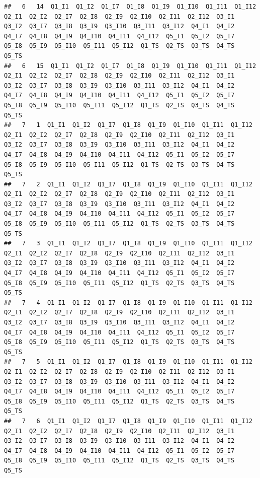 \documentclass[
]{book}
\begin{document}
\begin{verbatim}
##   6   14  Q1_I1  Q1_I2  Q1_I7  Q1_I8  Q1_I9  Q1_I10  Q1_I11  Q1_I12  Q2_I1  Q2_I2  Q2_I7  Q2_I8  Q2_I9  Q2_I10  Q2_I11  Q2_I12  Q3_I1  Q3_I2  Q3_I7  Q3_I8  Q3_I9  Q3_I10  Q3_I11  Q3_I12  Q4_I1  Q4_I2  Q4_I7  Q4_I8  Q4_I9  Q4_I10  Q4_I11  Q4_I12  Q5_I1  Q5_I2  Q5_I7  Q5_I8  Q5_I9  Q5_I10  Q5_I11  Q5_I12  Q1_TS  Q2_TS  Q3_TS  Q4_TS  Q5_TS
##   6   15  Q1_I1  Q1_I2  Q1_I7  Q1_I8  Q1_I9  Q1_I10  Q1_I11  Q1_I12  Q2_I1  Q2_I2  Q2_I7  Q2_I8  Q2_I9  Q2_I10  Q2_I11  Q2_I12  Q3_I1  Q3_I2  Q3_I7  Q3_I8  Q3_I9  Q3_I10  Q3_I11  Q3_I12  Q4_I1  Q4_I2  Q4_I7  Q4_I8  Q4_I9  Q4_I10  Q4_I11  Q4_I12  Q5_I1  Q5_I2  Q5_I7  Q5_I8  Q5_I9  Q5_I10  Q5_I11  Q5_I12  Q1_TS  Q2_TS  Q3_TS  Q4_TS  Q5_TS
##   7   1  Q1_I1  Q1_I2  Q1_I7  Q1_I8  Q1_I9  Q1_I10  Q1_I11  Q1_I12  Q2_I1  Q2_I2  Q2_I7  Q2_I8  Q2_I9  Q2_I10  Q2_I11  Q2_I12  Q3_I1  Q3_I2  Q3_I7  Q3_I8  Q3_I9  Q3_I10  Q3_I11  Q3_I12  Q4_I1  Q4_I2  Q4_I7  Q4_I8  Q4_I9  Q4_I10  Q4_I11  Q4_I12  Q5_I1  Q5_I2  Q5_I7  Q5_I8  Q5_I9  Q5_I10  Q5_I11  Q5_I12  Q1_TS  Q2_TS  Q3_TS  Q4_TS  Q5_TS
##   7   2  Q1_I1  Q1_I2  Q1_I7  Q1_I8  Q1_I9  Q1_I10  Q1_I11  Q1_I12  Q2_I1  Q2_I2  Q2_I7  Q2_I8  Q2_I9  Q2_I10  Q2_I11  Q2_I12  Q3_I1  Q3_I2  Q3_I7  Q3_I8  Q3_I9  Q3_I10  Q3_I11  Q3_I12  Q4_I1  Q4_I2  Q4_I7  Q4_I8  Q4_I9  Q4_I10  Q4_I11  Q4_I12  Q5_I1  Q5_I2  Q5_I7  Q5_I8  Q5_I9  Q5_I10  Q5_I11  Q5_I12  Q1_TS  Q2_TS  Q3_TS  Q4_TS  Q5_TS
##   7   3  Q1_I1  Q1_I2  Q1_I7  Q1_I8  Q1_I9  Q1_I10  Q1_I11  Q1_I12  Q2_I1  Q2_I2  Q2_I7  Q2_I8  Q2_I9  Q2_I10  Q2_I11  Q2_I12  Q3_I1  Q3_I2  Q3_I7  Q3_I8  Q3_I9  Q3_I10  Q3_I11  Q3_I12  Q4_I1  Q4_I2  Q4_I7  Q4_I8  Q4_I9  Q4_I10  Q4_I11  Q4_I12  Q5_I1  Q5_I2  Q5_I7  Q5_I8  Q5_I9  Q5_I10  Q5_I11  Q5_I12  Q1_TS  Q2_TS  Q3_TS  Q4_TS  Q5_TS
##   7   4  Q1_I1  Q1_I2  Q1_I7  Q1_I8  Q1_I9  Q1_I10  Q1_I11  Q1_I12  Q2_I1  Q2_I2  Q2_I7  Q2_I8  Q2_I9  Q2_I10  Q2_I11  Q2_I12  Q3_I1  Q3_I2  Q3_I7  Q3_I8  Q3_I9  Q3_I10  Q3_I11  Q3_I12  Q4_I1  Q4_I2  Q4_I7  Q4_I8  Q4_I9  Q4_I10  Q4_I11  Q4_I12  Q5_I1  Q5_I2  Q5_I7  Q5_I8  Q5_I9  Q5_I10  Q5_I11  Q5_I12  Q1_TS  Q2_TS  Q3_TS  Q4_TS  Q5_TS
##   7   5  Q1_I1  Q1_I2  Q1_I7  Q1_I8  Q1_I9  Q1_I10  Q1_I11  Q1_I12  Q2_I1  Q2_I2  Q2_I7  Q2_I8  Q2_I9  Q2_I10  Q2_I11  Q2_I12  Q3_I1  Q3_I2  Q3_I7  Q3_I8  Q3_I9  Q3_I10  Q3_I11  Q3_I12  Q4_I1  Q4_I2  Q4_I7  Q4_I8  Q4_I9  Q4_I10  Q4_I11  Q4_I12  Q5_I1  Q5_I2  Q5_I7  Q5_I8  Q5_I9  Q5_I10  Q5_I11  Q5_I12  Q1_TS  Q2_TS  Q3_TS  Q4_TS  Q5_TS
##   7   6  Q1_I1  Q1_I2  Q1_I7  Q1_I8  Q1_I9  Q1_I10  Q1_I11  Q1_I12  Q2_I1  Q2_I2  Q2_I7  Q2_I8  Q2_I9  Q2_I10  Q2_I11  Q2_I12  Q3_I1  Q3_I2  Q3_I7  Q3_I8  Q3_I9  Q3_I10  Q3_I11  Q3_I12  Q4_I1  Q4_I2  Q4_I7  Q4_I8  Q4_I9  Q4_I10  Q4_I11  Q4_I12  Q5_I1  Q5_I2  Q5_I7  Q5_I8  Q5_I9  Q5_I10  Q5_I11  Q5_I12  Q1_TS  Q2_TS  Q3_TS  Q4_TS  Q5_TS

\end{verbatim}
\end{document}
